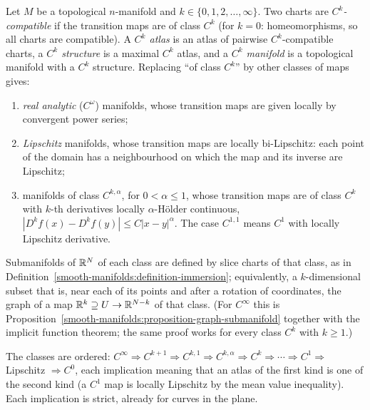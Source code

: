 \begin{definition}\label{smooth-manifolds:definition-regularity}
Let $M$ be a topological $n$-manifold and $k \in \{0, 1, 2, \ldots, \infty\}$. Two charts are \emph{$C^k$-compatible} if the transition maps are of class $C^k$ (for $k = 0$: homeomorphisms, so all charts are
compatible). A \emph{$C^k$ atlas} is an atlas of pairwise $C^k$-compatible charts, a \emph{$C^k$ structure} is a maximal $C^k$ atlas, and a \emph{$C^k$ manifold} is a topological manifold with a $C^k$ structure.
Replacing ``of class $C^k$'' by other classes of maps gives:
\begin{enumerate}
\item \emph{real analytic} ($C^\omega$) manifolds, whose transition maps are given locally by convergent power series;
\item \emph{Lipschitz} manifolds, whose transition maps are locally bi-Lipschitz: each point of the domain has a neighbourhood on which the map and its inverse are Lipschitz;
\item manifolds of class $C^{k,\alpha}$, for $0 < \alpha \leq 1$, whose transition maps are of class $C^k$ with $k$-th derivatives locally $\alpha$-H\"older continuous, $|D^kf(x) - D^kf(y)| \leq C|x - y|^\alpha$. The case
$C^{1,1}$ means $C^1$ with locally Lipschitz derivative.
\end{enumerate}
Submanifolds of $\mathbb{R}^N$ of each class are defined by slice charts of that class, as in Definition~\ref{smooth-manifolds:definition-immersion}; equivalently, a $k$-dimensional subset that is, near each of its points and
after a rotation of coordinates, the graph of a map $\mathbb{R}^k \supseteq U \to \mathbb{R}^{N-k}$ of that class. (For $C^\infty$ this is Proposition~\ref{smooth-manifolds:proposition-graph-submanifold} together with the implicit function
theorem; the same proof works for every class $C^k$ with $k \geq 1$.)
\end{definition}

The classes are ordered: $C^\infty \Rightarrow C^{k+1} \Rightarrow C^{k,1} \Rightarrow C^{k,\alpha} \Rightarrow C^k \Rightarrow \cdots \Rightarrow C^1 \Rightarrow$ Lipschitz $\Rightarrow C^0$, each implication meaning that an atlas of the first
kind is one of the second kind (a $C^1$ map is locally Lipschitz by the mean value inequality). Each implication is strict, already for curves in the plane.

